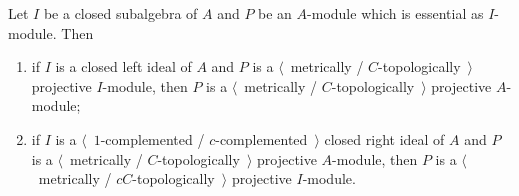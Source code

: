 \begin{proposition}\label{MetTopProjUnderChangeOfAlg} Let $I$ be a closed
subalgebra of $A$ and $P$ be an $A$-module which is essential as $I$-module.
Then

\begin{enumerate}[label = (\roman*)]
    \item if $I$ is a closed left ideal of $A$ and $P$ is a $\langle$~metrically /
    $C$-topologically~$\rangle$  projective $I$-module, then $P$ is a
    $\langle$~metrically / $C$-topologically~$\rangle$ projective $A$-module;

    \item if $I$ is a $\langle$~$1$-complemented / $c$-complemented~$\rangle$
    closed right ideal of $A$ and $P$ is a $\langle$~metrically /
    $C$-topologically~$\rangle$ projective $A$-module, then $P$ is a
    $\langle$~metrically / $cC$-topologically~$\rangle$ projective $I$-module.
\end{enumerate}
\end{proposition}
